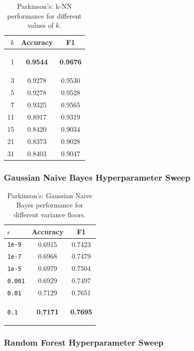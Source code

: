 \documentclass[11pt]{article}
\newcommand{\best}[1]{\colorbox{bestgray}{\strut\textbf{#1}}}
\begin{document}
\begin{table}[H]
\centering
\caption{Parkinson's: k-NN performance for different values of $k$.}
\begin{tabular}{rcc}
\toprule
$k$ & Accuracy & F1 \\
\midrule
1  & \best{0.9544} & \best{0.9676} \\
3  & 0.9278 & 0.9530 \\
5  & 0.9278 & 0.9528 \\
7  & 0.9325 & 0.9565 \\
11 & 0.8917 & 0.9319 \\
15 & 0.8420 & 0.9034 \\
21 & 0.8373 & 0.9028 \\
31 & 0.8403 & 0.9047 \\
\bottomrule
\end{tabular}
\end{table}

\subsubsection*{Gaussian Naive Bayes Hyperparameter Sweep}

\begin{table}[H]
\centering
\caption{Parkinson's: Gaussian Naive Bayes performance for different variance floors.}
\begin{tabular}{lcc}
\toprule
$\epsilon$ & Accuracy & F1 \\
\midrule
\texttt{1e-9} & 0.6915 & 0.7423 \\
\texttt{1e-7} & 0.6968 & 0.7479 \\
\texttt{1e-5} & 0.6979 & 0.7504 \\
\texttt{0.001} & 0.6929 & 0.7497 \\
\texttt{0.01} & 0.7129 & 0.7651 \\
\texttt{0.1} & \best{0.7171} & \best{0.7695} \\
\bottomrule
\end{tabular}
\end{table}

\subsubsection*{Random Forest Hyperparameter Sweep}
\end{document}
